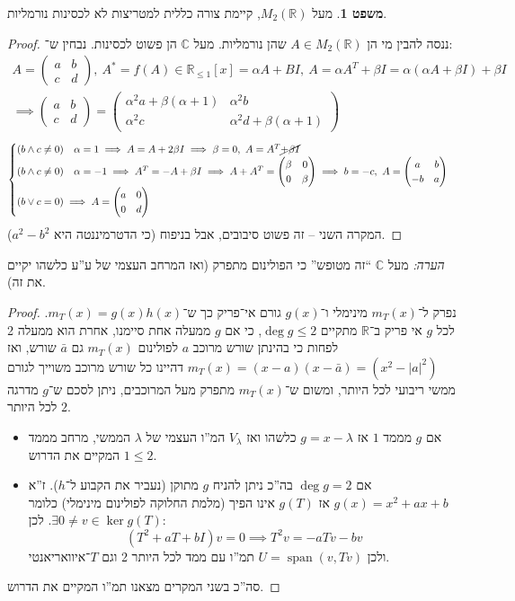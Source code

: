 \documentclass[a4paper]{article}
\newcommand\R     {\mathbb{R}}
\newcommand\C     {\mathbb{C}}
\DeclareMathOperator{\Sp}      {span}
\newcommand\pms[1]    {\begin{pmatrix}
		#1
\end{pmatrix}}
\newcommand\ag        {\alpha}
\newcommand\bg        {\beta}
\renewcommand\lg      {\lambda}
\newcommand\sof[1]    {\left | #1 \right |}
\theoremstyle{definition}
\newtheorem{Theorem}{\color{myblue}משפט}
\newcommand\theo  [1] {\begin{Theorem}#1\end{Theorem}}
\begin{document}
	\theo{מעל $M_2(\R)$, קיימת צורה כללית למטריצות לא לכסינות נורמליות. }
	\begin{proof}
		ננסה להבין מי הן $A \in M_2(\R)$ שהן נורמליות. מעל $\C$ הן פשוט לכסינות. נבחין ש־: 
		\begin{gather}
			A = \pms{a & b \\ c & d}, \ A^* = f(A) \in \R_{\le1}[x] = \ag A + BI, \ A = \ag A^T + \bg I = \ag(\ag A + \bg I) + \bg I \\
			\implies \pms{a & b \\ c & d} = \pms{\ag^2 a + \bg(\ag + 1) & \ag^2 b \\ \ag^2 c & \ag^2 d + \bg (\ag + 1)}
		\end{gather}
		\begin{align*}
			\begin{cases}
				(b \land c \neq 0 ) \quad \ag = 1 \implies  A = A + 2 \bg I \implies \bg = 0, \ A = A^T \cancel{+ \bg I} \\
				(b \land c \neq 0) \quad \ag = -1 \implies A^T = - A  +\bg I  \implies A + A^T = \pms{\bg & 0 \\ 0 & \bg} \implies b = -c, \ A = \pms{a & b \\ -b & a} \\
				(b \lor c = 0) \implies A = \pms{a & 0 \\ 0 & d}
			\end{cases}
		\end{align*}
		המקרה השני – זה פשוט סיבובים, אבל בניפוח (כי הדטרמיננטה היא $a^2 - b^2$). 
	\end{proof}
	
	\textit{הערה: }מעל $\C$ ``זה מטופש'' כי הפולינום מתפרק (ואז המרחב העצמי של ע''ע כלשהו יקיים את זה). 
	\begin{proof}
		נפרק ל־$m_T(x)$ מינימלי ו־$g(x)$ גורם אי־פריק כך ש־$m_T(x) = g(x)h(x)$. לכל $g$ אי פריק ב־$\R$ מתקיים $\deg g \le 2$, כי אם $g$ ממעלה אחת סיימנו, אחרת הוא ממעלה 2 לפחות כי בהינתן שורש מרוכב $a$ לפולינום $m_T(x)$ גם $\bar a$ שורש, ואז $m_T(x) = (x - a)(x - \bar a) = (x^2 - \sof{a}^2)$ דהיינו כל שורש מרוכב משוייך לגורם ממשי ריבועי לכל היותר, ומשום ש־$m_T(x)$ מתפרק מעל המרוכבים, ניתן לסכם ש־$g$ מדרגה $2$ לכל היותר. 
		\begin{itemize}
			\item אם $g$ מממד $1$ אז $g = x - \lg$ כלשהו ואז $V_{\lg}$ המ''ו העצמי של $\lg$ הממשי, מרחב מממד $1 \le 2$ המקיים את הדרוש. 
			\item אם $\deg g = 2$ בה''כ ניתן להניח $g$ מתוקן (נעביר את הקבוע ל־$h$). ז''א $g(x) = x^2 + ax + b$ אז $g(T)$ אינו הפיך (מלמת החלוקה לפולינום מינימלי) כלומר $\exists 0 \neq v \in \ker g(T)$. 
			לכן: 
			\[ (T^2 + aT + bI)v = 0 \implies T^2v = -a T v - bv \]
			ולכן $U = \Sp(v, Tv)$ תמ''ו עם ממד לכל היותר 2 וגם $T$־איוואריאנטי. 
		\end{itemize}סה''כ בשני המקרים מצאנו תמ''ו המקיים את הדרוש. 
	\end{proof}
	
\end{document}

